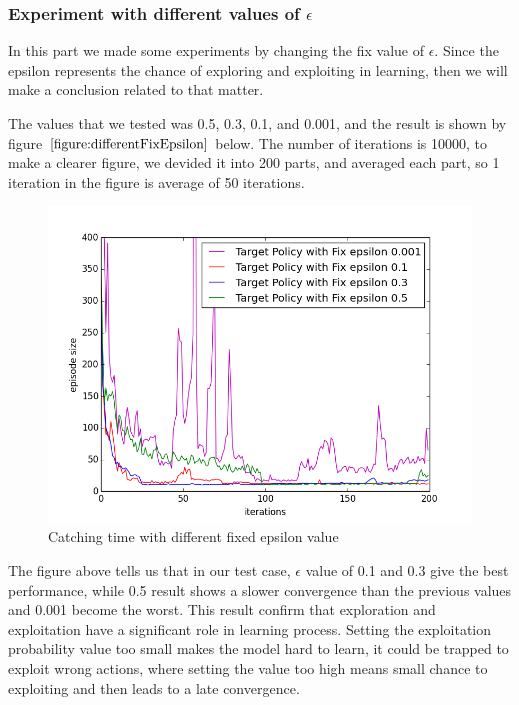 \documentclass[paper=a4, fontsize=11pt]{scrartcl}
\numberwithin{equation}{section}		%
\numberwithin{figure}{section}			%
\numberwithin{table}{section}				%
\begin{document}
\subsubsection*{Experiment with different values of $\epsilon$}
In this part we made some experiments by changing the fix value of $\epsilon$. Since the epsilon represents the chance of exploring and exploiting in learning, then we will make a conclusion related to that matter. 

The values that we tested was 0.5, 0.3, 0.1, and 0.001, and the result is shown by figure $\ref{figure:differentFixEpsilon}$ below. The number of iterations is  10000, to make a clearer figure, we devided it into 200 parts, and averaged each part, so 1 iteration in the figure is average of 50 iterations. 
\begin{figure}[H] \centering
\includegraphics[scale=0.6]{target_fix_different_epsilon4.png}
\caption{Catching time with different fixed epsilon value} \label{figure:differentFixEpsilon}
\end{figure}

The figure above tells us that in our test case, $\epsilon$ value of 0.1 and 0.3 give the best performance, while 0.5 result shows a slower convergence than the previous values and 0.001 become the worst. This result confirm that exploration and exploitation have a significant role in learning process. Setting the exploitation probability value too small makes the model hard to learn, it could be trapped to exploit wrong actions, where setting the value too high means small chance to exploiting and then leads to a late convergence.
\end{document}
